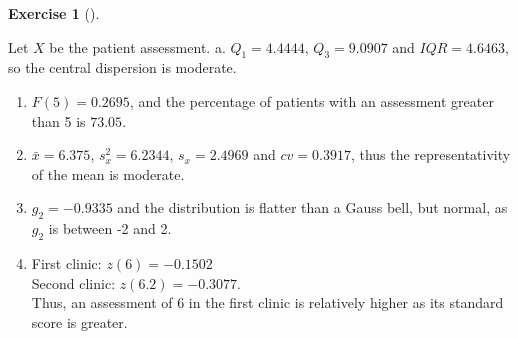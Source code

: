 \documentclass[
  a4paper,
]{scrreport}
\theoremstyle{definition}
\newtheorem{exercise}{Exercise}[chapter]
\theoremstyle{remark}
\begin{document}
\begin{exercise}[]
\begin{tcolorbox}[enhanced jigsaw, opacitybacktitle=0.6, breakable, toptitle=1mm, colbacktitle=quarto-callout-tip-color!10!white, colframe=quarto-callout-tip-color-frame, toprule=.15mm, rightrule=.15mm, bottomrule=.15mm, coltitle=black, left=2mm, bottomtitle=1mm, title=\textcolor{quarto-callout-tip-color}{\faLightbulb}\hspace{0.5em}{Solution}, titlerule=0mm, arc=.35mm, opacityback=0, leftrule=.75mm, colback=white]

Let \(X\) be the patient assessment. a. \(Q_1= 4.4444\), \(Q_3=9.0907\)
and \(IQR = 4.6463\), so the central dispersion is moderate.

\begin{enumerate}
\def\labelenumi{\alph{enumi}.}
\item
  \(F(5)=0.2695\), and the percentage of patients with an assessment
  greater than 5 is \(73.05%
  \).
\item
  \(\bar x = 6.375\), \(s_x^2 = 6.2344\), \(s_x=2.4969\) and
  \(cv=0.3917\), thus the representativity of the mean is moderate.
\item
  \(g_2 = -0.9335\) and the distribution is flatter than a Gauss bell,
  but normal, as \(g_2\) is between -2 and 2.
\item
  First clinic: \(z(6)=-0.1502\)\\
  Second clinic: \(z(6.2)=-0.3077\).\\
  Thus, an assessment of 6 in the first clinic is relatively higher as
  its standard score is greater.
\end{enumerate}

\end{tcolorbox}

\end{exercise}
\end{document}
